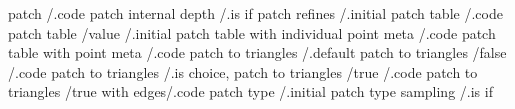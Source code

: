 patch                                                 /.code          
patch internal depth                                  /.is if         
patch refines                                         /.initial       
patch table                                           /.code          
patch table                           /value          /.initial
patch table with individual point meta                /.code          
patch table with point meta                           /.code          
patch to triangles                                    /.default       
patch to triangles                    /false          /.code
patch to triangles                                    /.is choice,    
patch to triangles                    /true           /.code
patch to triangles                    /true with edges/.code
patch type                                            /.initial       
patch type sampling                                   /.is if         

